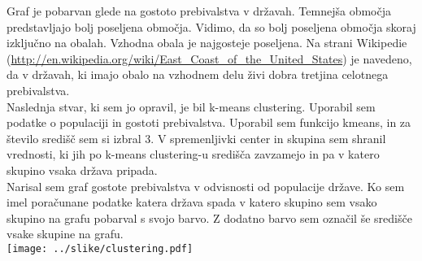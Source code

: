 \documentclass[11pt,a4paper]{article}
\begin{document}
Graf je pobarvan glede na gostoto prebivalstva v državah. Temnejša območja predstavljajo bolj poseljena območja. Vidimo, da so bolj poseljena območja skoraj izključno na obalah. Vzhodna obala je najgosteje poseljena. Na strani Wikipedie (\url{http://en.wikipedia.org/wiki/East_Coast_of_the_United_States}) je navedeno, da v državah, ki imajo obalo na vzhodnem delu živi dobra tretjina celotnega prebivalstva.\\

Naslednja stvar, ki sem jo opravil, je bil k-means clustering. Uporabil sem podatke o populaciji in gostoti prebivalstva. Uporabil sem funkcijo kmeans, in za število središč sem si izbral 3.
V spremenljivki center in skupina sem shranil vrednosti, ki jih po k-means clustering-u središča zavzamejo in pa v katero skupino vsaka država pripada.\\

Narisal sem graf gostote prebivalstva v odvisnosti od populacije države. Ko sem imel poračunane podatke katera država spada v katero skupino sem vsako skupino na grafu pobarval s svojo barvo. Z dodatno barvo sem označil še središče vsake skupine na grafu.\\

\texttt{[image: ../slike/clustering.pdf]}
\end{document}
